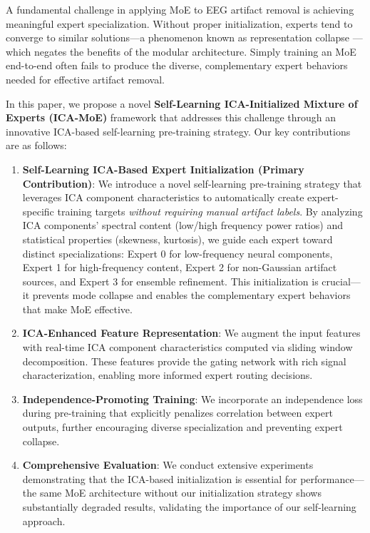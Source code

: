 \documentclass[journal]{IEEEtran}
\begin{document}
A fundamental challenge in applying MoE to EEG artifact removal is achieving meaningful expert specialization. Without proper initialization, experts tend to converge to similar solutions---a phenomenon known as representation collapse \cite{chi2022representation}---which negates the benefits of the modular architecture. Simply training an MoE end-to-end often fails to produce the diverse, complementary expert behaviors needed for effective artifact removal.

In this paper, we propose a novel \textbf{Self-Learning ICA-Initialized Mixture of Experts (ICA-MoE)} framework that addresses this challenge through an innovative ICA-based self-learning pre-training strategy. Our key contributions are as follows:

\begin{enumerate}
\item \textbf{Self-Learning ICA-Based Expert Initialization (Primary Contribution)}: We introduce a novel self-learning pre-training strategy that leverages ICA component characteristics to automatically create expert-specific training targets \textit{without requiring manual artifact labels}. By analyzing ICA components' spectral content (low/high frequency power ratios) and statistical properties (skewness, kurtosis), we guide each expert toward distinct specializations: Expert 0 for low-frequency neural components, Expert 1 for high-frequency content, Expert 2 for non-Gaussian artifact sources, and Expert 3 for ensemble refinement. This initialization is crucial---it prevents mode collapse and enables the complementary expert behaviors that make MoE effective.

\item \textbf{ICA-Enhanced Feature Representation}: We augment the input features with real-time ICA component characteristics computed via sliding window decomposition. These features provide the gating network with rich signal characterization, enabling more informed expert routing decisions.

\item \textbf{Independence-Promoting Training}: We incorporate an independence loss during pre-training that explicitly penalizes correlation between expert outputs, further encouraging diverse specialization and preventing expert collapse.

\item \textbf{Comprehensive Evaluation}: We conduct extensive experiments demonstrating that the ICA-based initialization is essential for performance---the same MoE architecture without our initialization strategy shows substantially degraded results, validating the importance of our self-learning approach.
\end{enumerate}
\end{document}
